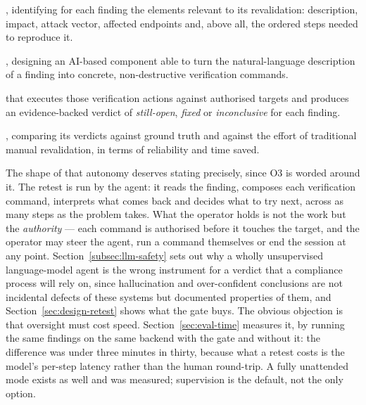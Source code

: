 \begin{enumerate}[labelindent=\parindent, leftmargin=*, label=\mbox{\bft{[O\arabic*]}}]
\item {}, identifying for each
  finding the elements relevant to its revalidation: description, impact, attack
  vector, affected endpoints and, above all, the ordered steps needed to reproduce
  it.
\item {}, designing an
  AI-based component able to turn the natural-language description of a finding into
  concrete, non-destructive verification commands.
\item {} that executes
  those verification actions against authorised targets and produces an
  evidence-backed verdict of \emph{still-open}, \emph{fixed} or
  \emph{inconclusive} for each finding.
\item {}, comparing its
  verdicts against ground truth and against the effort of traditional manual
  revalidation, in terms of reliability and time saved.
\end{enumerate}

The shape of that autonomy deserves stating precisely, since O3 is worded around it. The
retest is run by the agent: it reads the finding, composes each verification command,
interprets what comes back and decides what to try next, across as many steps as the
problem takes. What the operator holds is not the work but the \emph{authority} --- each
command is authorised before it touches the target, and the operator may steer the agent,
run a command themselves or end the session at any point.
Section~\ref{subsec:llm-safety} sets out why a wholly unsupervised language-model agent
is the wrong instrument for a verdict that a compliance process will rely on, since
hallucination and over-confident conclusions are not incidental defects of these systems
but documented properties of them, and Section~\ref{sec:design-retest} shows what the
gate buys. The obvious objection is that oversight must cost speed.
Section~\ref{sec:eval-time} measures it, by running the same findings on the same backend
with the gate and without it: the difference was under three minutes in thirty, because
what a retest costs is the model's per-step latency rather than the human round-trip. A
fully unattended mode exists as well and was measured; supervision is the default, not
the only option.

